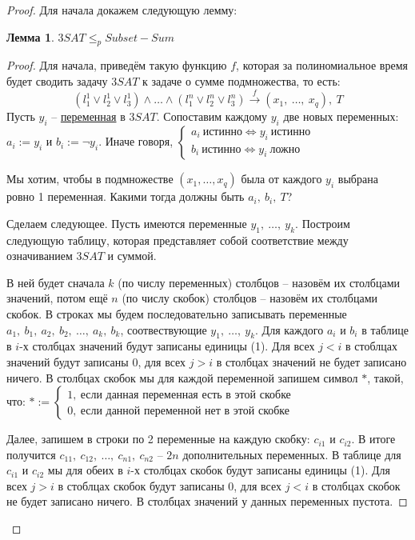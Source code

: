 \documentclass[a4paper,12pt]{article}
\newtheorem*{lemma}{Лемма}
\begin{document}
\begin{proof}
    Для начала докажем следующую лемму:
    \begin{lemma}
    $3SAT \leqslant_p Subset-Sum$
    \end{lemma}
    \begin{proof}
        Для начала, приведём такую функцию $f$, которая за полиномиальное время будет сводить задачу $3SAT$ к задаче о сумме подмножества, то есть:
        \[(l_1^1 \vee l_2^1 \vee l_3^1) \wedge \ldots \wedge (l_1^n \vee l_2^n \vee l_3^n) \overset{f}{\longrightarrow} (x_1,\ \ldots,\ x_q),\ T\]
        Пусть $y_i$ -- \underline{переменная} в $3SAT$. Сопоставим каждому $y_i$ две новых переменных: $a_i := y_i$ и $b_i := \neg y_i$. Иначе говоря, $\begin{cases}a_i\ \text{истинно} \Longleftrightarrow y_i\ \text{истинно} \\ b_i\ \text{истинно} \Longleftrightarrow y_i\ \text{ложно}\end{cases}$
        
        Мы хотим, чтобы в подмножестве $(x_1, \ldots, x_q)$ была от каждого $y_i$ выбрана ровно 1 переменная. Какими тогда должны быть $a_i,\ b_i,\ T$?
        
        Сделаем следующее. Пусть имеются переменные $y_1,\ \ldots,\ y_k$.
        Построим следующую таблицу, которая представляет собой соответствие между означиванием $3SAT$ и суммой.
        
        В ней будет сначала $k$ (по числу переменных) столбцов -- назовём их столбцами значений, потом ещё $n$ (по числу скобок) столбцов -- назовём их столбцами скобок. В строках мы будем последовательно записывать переменные $a_1,\ b_1,\ a_2,\ b_2,\ \ldots,\ a_k,\ b_k$, соотвествующие $y_1,\ \ldots,\ y_k$. Для каждого $a_i$ и $b_i$ в таблице в $i$-х столбцах значений будут записаны единицы (1). Для всех $j < i$ в стоблцах значений будут записаны 0, для всех $j > i$ в столбцах значений не будет записано ничего. В столбцах скобок мы для каждой переменной запишем символ $\ast$, такой, что: $\ast := \begin{cases}1,\ \text{если данная переменная есть в этой скобке}\\ 0,\ \text{если данной переменной нет в этой скобке}\end{cases}$
        
        Далее, запишем в строки по 2 переменные на каждую скобку: $c_{i1}$ и $c_{i2}$. В итоге получится $c_{11},\ c_{12},\ \ldots,\ c_{n1},\ c_{n2}$ -- $2n$ дополнительных переменных. В таблице для $c_{i1}$ и $c_{i2}$ мы для обеих в $i$-х столбцах скобок будут записаны единицы (1). Для всех $j > i$ в стоблцах скобок будут записаны 0, для всех $j < i$ в столбцах скобок не будет записано ничего. В столбцах значений у данных переменных пустота.
        

\end{proof}
\end{proof}
\end{document}
